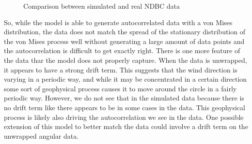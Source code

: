 \documentclass[12pt]{article}
\numberwithin{equation}{section}
\numberwithin{figure}{section}
\begin{document}
\begin{figure}[h]
\centering
{}
\caption{Comparison between simulated and real NDBC data}\label{fig:match to data}
\end{figure}

So, while the model is able to generate autocorrelated data with a von Mises distribution, the data does not match the spread of the stationary distribution of the von Mises process well without generating a large amount of data points and the autocorrelation is difficult to get exactly right. There is one more feature of the data thar the model does not properly capture. When the data is unwrapped, it appears to have a strong drift term. This suggests that the wind direction is varying in a periodic way, and while it may be concentrated in a certain direction some sort of geophysical process causes it to move around the circle in a fairly periodic way. However, we do not see that in the simulated data because there is no drift term like there appears to be in some cases in the data. This geophysical process is likely also driving the autocorrelation we see in the data. One possible extension of this model to better match the data could involve a drift term on the unwrapped angular data. 
\end{document}
